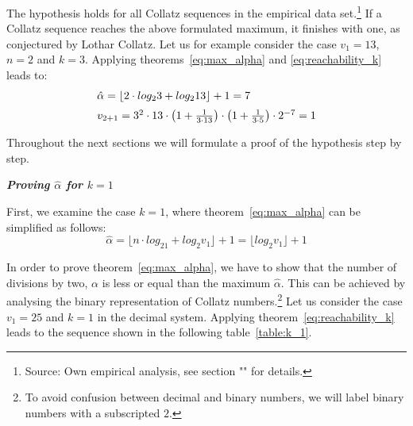 \documentclass{SciPress_2015}
\renewcommand{\subsection}[1]{\textit{\textbf{#1}}}
\begin{document}
The hypothesis holds for all Collatz sequences in the empirical data set.\footnote{Source: Own empirical analysis, see section "" for details.} If a Collatz sequence reaches the above formulated maximum, it finishes with one, as conjectured by Lothar Collatz. Let us for example consider the case $v_1=13$, $n=2$ and $k=3$. Applying theorems~\ref{eq:max_alpha} and \ref{eq:reachability_k} leads to:
\[
\begin{array}{l}
\hat\alpha=\lfloor 2\cdot log_23+log_213\rfloor+1=7\\[\medskipamount]
v_{2+1}=3^2\cdot 13\cdot\left(1+\frac{1}{3\cdot13}\right)\cdot\left(1+\frac{1}{3\cdot5}\right)\cdot2^{-7}=1
\end{array}
\]

\par\noindent
Throughout the next sections we will formulate a proof of the hypothesis step by step.

\vspace{1em}\noindent
\subsection{Proving \boldmath$\hat\alpha$ for \boldmath$k=1$}
\par\noindent
First, we examine the case $k=1$, where theorem~\ref{eq:max_alpha} can be simplified as follows:
\begin{equation}
\label{eq:max_alpha_1}
\hat\alpha=\lfloor n\cdot log_21+log_2v_1\rfloor+1=\lfloor log_2v_1\rfloor+1
\end{equation}

\par\noindent
In order to prove theorem~\ref{eq:max_alpha}, we have to show that the number of divisions by two, $\alpha$ is less or equal than the maximum $\hat\alpha$. This can be achieved by analysing the binary representation of Collatz numbers.\footnote{To avoid confusion between decimal and binary numbers, we will label binary numbers with a subscripted $2$.} Let us consider the case $v_1=25$ and $k=1$ in the decimal system. Applying theorem~\ref{eq:reachability_k} leads to the sequence shown in the following table~\ref{table:k_1}.
\end{document}
